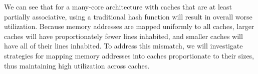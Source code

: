 We can see that for a many-core architecture with caches that are at least
partially associative, using a traditional hash function will result in overall
worse utilization.  Because memory addresses are mapped uniformly to all caches,
larger caches will have proportionately fewer lines inhabited, and smaller
caches will have all of their lines inhabited.  To address this mismatch, we
will investigate strategies for mapping memory addresses into caches
proportionate to their sizes, thus maintaining high utilization across caches.

